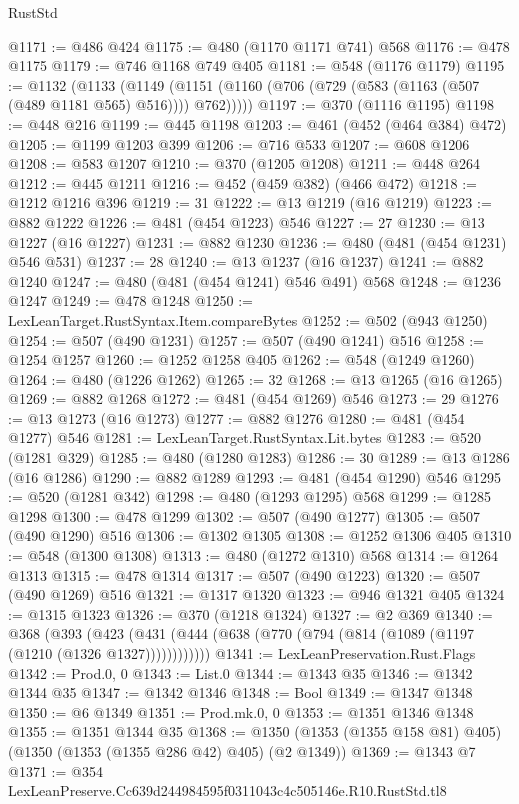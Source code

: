 \begin{lexlean}{RustStd}
\begin{coremodule}
@1171 := @486 @424
@1175 := @480 (@1170 @1171 @741) @568
@1176 := @478 @1175
@1179 := @746 @1168 @749 @405
@1181 := @548 (@1176 @1179)
@1195 := @1132
    (@1133 (@1149 (@1151 (@1160 (@706 (@729 (@583 (@1163 (@507 (@489 @1181 @565) @516)))) @762)))))
@1197 := @370 (@1116 @1195)
@1198 := @448 @216
@1199 := @445 @1198
@1203 := @461 (@452 (@464 @384) @472)
@1205 := @1199 @1203 @399
@1206 := @716 @533
@1207 := @608 @1206
@1208 := @583 @1207
@1210 := @370 (@1205 @1208)
@1211 := @448 @264
@1212 := @445 @1211
@1216 := @452 (@459 @382) (@466 @472)
@1218 := @1212 @1216 @396
@1219 := 31
@1222 := @13 @1219 (@16 @1219)
@1223 := @882 @1222
@1226 := @481 (@454 @1223) @546
@1227 := 27
@1230 := @13 @1227 (@16 @1227)
@1231 := @882 @1230
@1236 := @480 (@481 (@454 @1231) @546 @531)
@1237 := 28
@1240 := @13 @1237 (@16 @1237)
@1241 := @882 @1240
@1247 := @480 (@481 (@454 @1241) @546 @491) @568
@1248 := @1236 @1247
@1249 := @478 @1248
@1250 := LexLeanTarget.RustSyntax.Item.compareBytes
@1252 := @502 (@943 @1250)
@1254 := @507 (@490 @1231)
@1257 := @507 (@490 @1241) @516
@1258 := @1254 @1257
@1260 := @1252 @1258 @405
@1262 := @548 (@1249 @1260)
@1264 := @480 (@1226 @1262)
@1265 := 32
@1268 := @13 @1265 (@16 @1265)
@1269 := @882 @1268
@1272 := @481 (@454 @1269) @546
@1273 := 29
@1276 := @13 @1273 (@16 @1273)
@1277 := @882 @1276
@1280 := @481 (@454 @1277) @546
@1281 := LexLeanTarget.RustSyntax.Lit.bytes
@1283 := @520 (@1281 @329)
@1285 := @480 (@1280 @1283)
@1286 := 30
@1289 := @13 @1286 (@16 @1286)
@1290 := @882 @1289
@1293 := @481 (@454 @1290) @546
@1295 := @520 (@1281 @342)
@1298 := @480 (@1293 @1295) @568
@1299 := @1285 @1298
@1300 := @478 @1299
@1302 := @507 (@490 @1277)
@1305 := @507 (@490 @1290) @516
@1306 := @1302 @1305
@1308 := @1252 @1306 @405
@1310 := @548 (@1300 @1308)
@1313 := @480 (@1272 @1310) @568
@1314 := @1264 @1313
@1315 := @478 @1314
@1317 := @507 (@490 @1223)
@1320 := @507 (@490 @1269) @516
@1321 := @1317 @1320
@1323 := @946 @1321 @405
@1324 := @1315 @1323
@1326 := @370 (@1218 @1324)
@1327 := @2 @369
@1340 := @368
    (@393 (@423 (@431 (@444 (@638 (@770 (@794 (@814 (@1089 (@1197 (@1210 (@1326 @1327))))))))))))
@1341 := LexLeanPreservation.Rust.Flags
@1342 := Prod.{0, 0}
@1343 := List.{0}
@1344 := @1343 @35
@1346 := @1342 @1344 @35
@1347 := @1342 @1346
@1348 := Bool
@1349 := @1347 @1348
@1350 := @6 @1349
@1351 := Prod.mk.{0, 0}
@1353 := @1351 @1346 @1348
@1355 := @1351 @1344 @35
@1368 := @1350 (@1353 (@1355 @158 @81) @405) (@1350 (@1353 (@1355 @286 @42) @405) (@2 @1349))
@1369 := @1343 @7
@1371 := @354 LexLeanPreserve.Cc639d244984595f0311043c4c505146e.R10.RustStd.tl8

\end{coremodule}
\end{lexlean}
